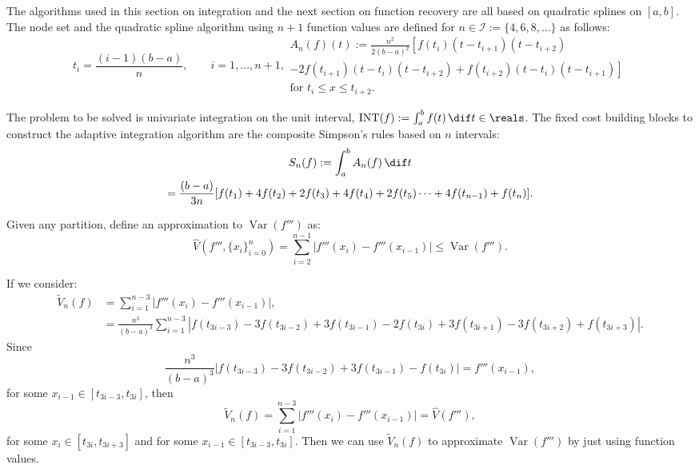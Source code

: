 \documentclass[]{elsarticle}
\DeclareMathOperator{\Var}{Var}
\DeclareMathOperator{\INT}{INT}
\theoremstyle{definition}
\theoremstyle{remark}
\begin{document}
The algorithms used in this section on integration and the next section on function recovery are all based on quadratic splines on $[a,b]$.  The node set and the quadratic spline algorithm using $n+1$ function values are defined for $n \in \mathcal{I}:=\{4,6,8, \ldots\}$ as follows:
\begin{subequations} \label{linearspline}
\begin{equation}
t_i=\frac{(i-1)(b-a)}{n}, \qquad i=1, \ldots, n+1,
\end{equation}
\begin{multline}
A_{n}(f)(t):=\frac{n^2}{2(b-a)^2} \left[ f(t_{i})(t-t_{i+1})(t-t_{i+2})\right. \\\left.- 2f(t_{i+1})(t-t_{i})(t-t_{i+2}) +f(t_{i+2})(t-t_i)(t-t_{i+1}) \right] \\ \text{for }t_i \leq x \leq t_{i+2}.
\end{multline}
\end{subequations}

The problem to be solved is univariate integration on the unit interval, $\INT(f):=\int_{a}^{b}f(t) \, \dif t \in \reals$.  The fixed cost building blocks to construct the adaptive integration algorithm are the composite Simpson's rules based on $n$ intervals:
\begin{multline}
    S_{n}(f) := \int_a^b A_n(f) \, \dif t \\
    =\frac{(b-a)}{3n}[f(t_1)+4f(t_2)+2f(t_3)+4f(t_4)+2f(t_5)\cdots+4f(t_{n-1})+f(t_n)].
\end{multline}

Given any partition, define an approximation to $\Var(f''')$ as:
$$\widehat{V}(f''',\{x_i\}_{i=0}^{n})=\sum_{i=2}^{n-1}|f'''(x_i)-f'''(x_{i-1})|\leq\Var(f''').$$

If we consider:
\begin{align*}
\widetilde{V}_n(f)&=\sum_{i=1}^{n-3}\left|f'''(x_{i})-f'''(x_{i-1})\right|,\\
&=\frac{n^3}{(b-a)^3}\sum_{i=1}^{n-3}\left|f(t_{3i-3})-3f(t_{3i-2})+3f(t_{3i-1})-2f(t_{3i})+3f(t_{3i+1})-3f(t_{3i+2})+f(t_{3i+3})\right|.
\end{align*}
Since $$\frac{n^3}{(b-a)^3}\left|f(t_{3i-3})-3f(t_{3i-2})+3f(t_{3i-1})-f(t_{3i})\right|=f'''(x_{i-1}),$$ for some $x_{i-1} \in [t_{3i-3},t_{3i}]$,
then $$\widetilde{V}_n(f)=\sum_{i=1}^{n-3}\left|f'''(x_{i})-f'''(x_{i-1})\right|=\widehat{V}(f'''),$$ for some $x_i \in [t_{3i},t_{3i+3}]$ and for some $x_{i-1} \in [t_{3i-3},t_{3i}].$ Then we can use $\widetilde{V}_n(f)$ to approximate $\Var(f''')$ by just using function values.
\end{document}
